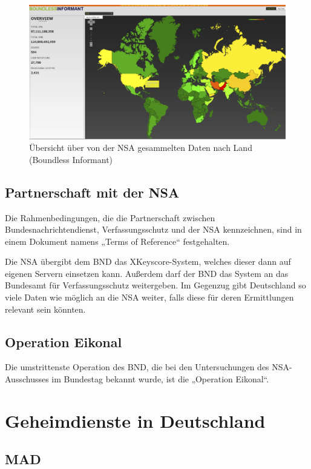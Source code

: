\documentclass[12pt,a4paper]{scrartcl}
\begin{document}
\begin{figure}[H]
\centering
\includegraphics[width=\textwidth]{images/bi.png}
\caption{Übersicht über von der NSA gesammelten Daten nach Land (Boundless Informant)}
\label{fig:boundless_informant}
\end{figure}

\subsection{Partnerschaft mit der NSA}
Die Rahmenbedingungen, die die Partnerschaft zwischen Bundesnachrichtendienst, Verfassungsschutz und der NSA kennzeichnen, sind in einem Dokument namens „Terms of Reference“ festgehalten.

Die NSA übergibt dem BND das XKeyscore-System, welches dieser dann auf eigenen Servern einsetzen kann. Außerdem darf der BND das System an das Bundesamt für Verfassungsschutz weitergeben. Im Gegenzug gibt Deutschland so viele Daten wie möglich an die NSA weiter, falls diese für deren Ermittlungen relevant sein könnten.

\subsection{Operation Eikonal}
Die umstrittenste Operation des BND, die bei den Untersuchungen des NSA-Ausschusses im Bundestag bekannt wurde, ist die „Operation Eikonal“.

\section{Geheimdienste in Deutschland}

\subsection{MAD}
\end{document}
